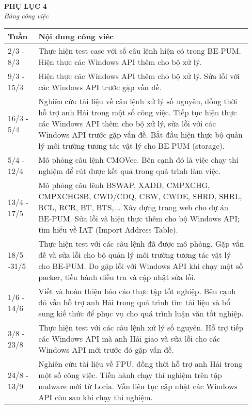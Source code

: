 \begin{center}
	\begin{huge}
			\textbf{PHỤ LỤC 4}\\
			\textit{Bảng công việc}
	\end{huge}
\end{center}

	\begin{longtable}{|l|m{13cm}|}
		\hline
			Tuần & Nội dung công viêc \\
		\hline
		\hline
			2/3 - 8/3	& Thực hiện test case với số câu lệnh hiện có trong BE-PUM. Hiện thực các Windows API thêm cho bộ xử lý.\\
		\hline
			9/3 - 15/3	& Hiện thực các Windows API thêm cho bộ xử lý. Sửa lỗi với các Windows API trước gặp vấn đề.\\
		\hline	
			16/3 - 5/4&	Nghiên cứu tài liệu về câu lệnh xử lý số nguyên, đồng thời hỗ trợ anh Hải trong một số công việc. Tiếp tục hiện thực các Windows API thêm cho bộ xử lý, sửa lỗi với các Windows API trước gặp vấn đề. Bắt đầu hiện thực bộ quản lý môi trường tương tác vật lý cho BE-PUM (storage).\\
		\hline	
			5/4 - 12/4&	Mô phỏng câu lệnh CMOVcc. Bên cạnh đó là việc chạy thí nghiệm để rút được kết quả trong quá trình làm việc.\\
		\hline	
			13/4 - 17/5	&Mô phỏng câu lênh  BSWAP, XADD, CMPXCHG, CMPXCHG8B, CWD/CDQ, CBW, CWDE, SHRD, SHRL, RCL, RCR,  BT, BTS,... Xây dựng trang web cho dự án BE-PUM. Sửa lỗi và hiện thực thêm cho bộ Windows API; tìm hiểu về IAT (Import Address Table).\\		
		\hline	
			18/5 -31/5	&Thực hiện test với các câu lệnh đã được mô phỏng. Gặp vấn đề và sửa lỗi cho bộ quản lý môi trường tương tác vật lý cho BE-PUM. Do gặp lỗi với Windows API khi chạy một số packer, tiến hành điều tra và cập nhật sửa lỗi.\\
		\hline	
			1/6 - 14/6	& Viết và hoàn thiện báo cáo thực tập tốt nghiệp. Bên cạnh đó vẫn hỗ trợ anh Hải trong quá trình tìm tài liệu và bổ sung kiế thức để phục vụ cho quá trình luận văn tốt nghiệp.\\	
		\hline	
			3/8 - 23/8&	Thực hiện test với các câu lệnh xử lý số nguyên. Hỗ trợ tiếp các Windows API mà anh Hải giao và sửa lỗi cho các Windows API mới trước đó gặp vấn đề.\\
		\hline	
			24/8 - 13/9&	Nghiên cứu tài liệu về FPU, đồng thời hỗ trợ anh Hải trong một số công việc. Tiến hành chạy thí nghiệm trên tập malware mới từ Loria. Vấn liên tục cập nhật các Windows API còn sau khi chạy thí nghiệm.\\

\end{longtable}
